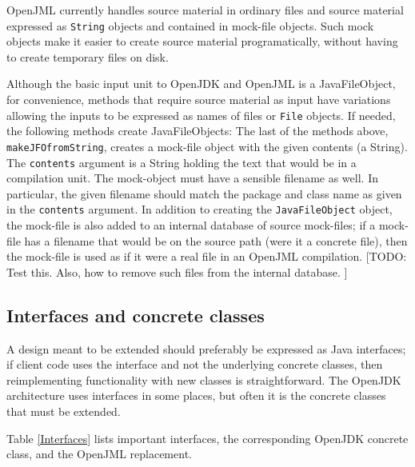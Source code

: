 OpenJML currently handles source material in ordinary files and source material expressed as {\tt String} objects
and contained in mock-file objects. Such mock objects make it easier to create source material programatically, 
without having to create temporary files on disk.

Although the basic input unit to OpenJDK and OpenJML is a JavaFileObject, for convenience, methods that require
source material as input have variations allowing the inputs to be expressed as names of files or {\tt File} objects.
If needed, the following methods create JavaFileObjects:
The last of the methods above, {\tt makeJFOfromString}, creates a mock-file object with the given contents (a String).
The {\tt contents} argument is a String holding the text that would be in a compilation unit.
The mock-object must have a sensible filename as well. In particular, the given filename should match the package and
class name as given in the {\tt contents} argument. In addition to creating the {\tt JavaFileObject} object, the 
mock-file is also added to an internal database of source mock-files; if a mock-file has a filename that would be on
the source path (were it a concrete file), then the mock-file is used as if it were a real file in an OpenJML compilation.
[TODO: Test this. Also, how to remove such files from the internal database. ] 

\subsection{Interfaces and concrete classes}

A design meant to be extended should preferably be expressed as Java interfaces; if client code uses the interface and not the underlying concrete classes, then reimplementing functionality with new classes is straightforward. The OpenJDK 
architecture uses interfaces in some places, but often it is the concrete classes that must be extended.

Table \ref{Interfaces} lists important interfaces, the corresponding OpenJDK concrete class, and the OpenJML replacement.

